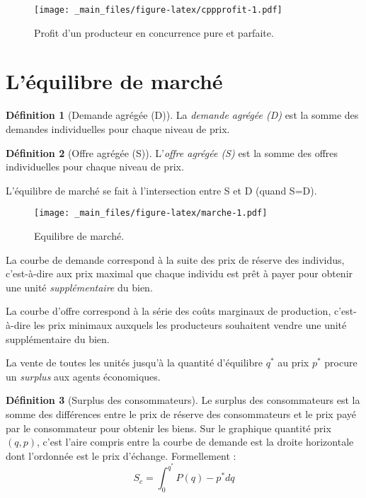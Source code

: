 \documentclass[
]{book}
\theoremstyle{definition}
\newtheorem{definition}{Définition}[chapter]
\theoremstyle{definition}
\theoremstyle{definition}
\theoremstyle{definition}
\theoremstyle{remark}
\begin{document}
\begin{figure}
\centering
\texttt{[image: \_main\_files/figure-latex/cppprofit-1.pdf]}
\caption{\label{fig:cppprofit}Profit d'un producteur en concurrence pure et parfaite.}
\end{figure}

\hypertarget{luxe9quilibre-de-marchuxe9}{%
\section{L'équilibre de marché}\label{luxe9quilibre-de-marchuxe9}}

\begin{definition}[Demande agrégée (D)]
La \emph{demande agrégée (D)} est la somme des demandes individuelles pour chaque niveau de prix.
\end{definition}

\begin{definition}[Offre agrégée (S)]
L'\emph{offre agrégée (S)} est la somme des offres individuelles pour chaque niveau de prix.
\end{definition}

L'équilibre de marché se fait à l'intersection entre S et D (quand S=D).

\begin{figure}
\centering
\texttt{[image: \_main\_files/figure-latex/marche-1.pdf]}
\caption{\label{fig:marche}Equilibre de marché.}
\end{figure}

La courbe de demande correspond à la suite des prix de réserve des individus, c'est-à-dire aux prix maximal que chaque individu est prêt à payer pour obtenir une unité \emph{supplémentaire} du bien.

La courbe d'offre correspond à la série des coûts marginaux de production, c'est-à-dire les prix minimaux auxquels les producteurs souhaitent vendre une unité supplémentaire du bien.

La vente de toutes les unités jusqu'à la quantité d'équilibre \(q^*\) au prix \(p^*\) procure un \emph{surplus} aux agents économiques.

\begin{definition}[Surplus des consommateurs]
Le surplus des consommateurs est la somme des différences entre le prix de réserve des consommateurs et le prix payé par le consommateur pour obtenir les biens.
Sur le graphique quantité prix \((q, p)\), c'est l'aire compris entre la courbe de demande est la droite horizontale dont l'ordonnée est le prix d'échange.
Formellement :
\[S_c=\int_0^{q^*}P(q)-p^* dq\]
\end{definition}
\end{document}
